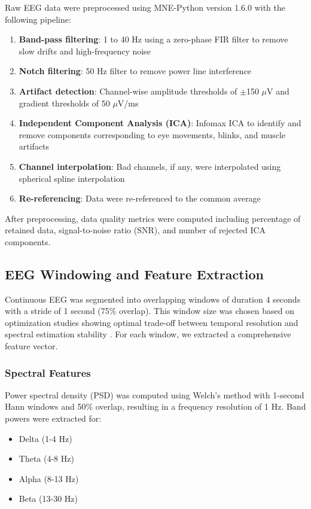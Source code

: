 Raw EEG data were preprocessed using MNE-Python version 1.6.0 with the following pipeline:

\begin{enumerate}
    \item \textbf{Band-pass filtering}: 1 to 40 Hz using a zero-phase FIR filter to remove slow drifts and high-frequency noise
    \item \textbf{Notch filtering}: 50 Hz filter to remove power line interference
    \item \textbf{Artifact detection}: Channel-wise amplitude thresholds of $\pm$150 $\mu$V and gradient thresholds of 50 $\mu$V/ms
    \item \textbf{Independent Component Analysis (ICA)}: Infomax ICA to identify and remove components corresponding to eye movements, blinks, and muscle artifacts
    \item \textbf{Channel interpolation}: Bad channels, if any, were interpolated using spherical spline interpolation
    \item \textbf{Re-referencing}: Data were re-referenced to the common average
\end{enumerate}

After preprocessing, data quality metrics were computed including percentage of retained data, signal-to-noise ratio (SNR), and number of rejected ICA components.

\subsection{EEG Windowing and Feature Extraction}

Continuous EEG was segmented into overlapping windows of duration 4 seconds with a stride of 1 second (75\% overlap). This window size was chosen based on optimization studies showing optimal trade-off between temporal resolution and spectral estimation stability \cite{dhuli2022tutorial}. For each window, we extracted a comprehensive feature vector.

\subsubsection{Spectral Features}

Power spectral density (PSD) was computed using Welch's method with 1-second Hann windows and 50\% overlap, resulting in a frequency resolution of 1 Hz. Band powers were extracted for:
\begin{itemize}
    \item Delta (1-4 Hz)
    \item Theta (4-8 Hz)
    \item Alpha (8-13 Hz)
    \item Beta (13-30 Hz)
\end{itemize}

